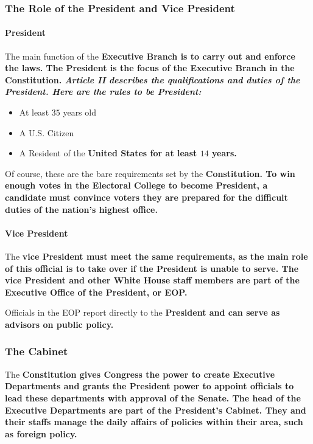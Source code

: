 
\subsubsection*{The Role of the President and Vice President}

\paragraph{President} The main function of the \bf{Executive Branch} is to carry
out and enforce the laws. The \bf{President} is the focus of the \bf{Executive
Branch} in the \bf{Constitution}. \it{Article II} describes the qualifications
and duties of the \bf{President}. Here are the rules to be \bf{President}:

\begin{itemize}
    \item At least $35$ years old
    \item A U.S. Citizen
    \item A Resident of the \bf{United States} for at least $14$ years.
\end{itemize}

Of course, these are the bare requirements set by the \bf{Constitution}. To win
enough votes in the \bf{Electoral College} to become \bf{President}, a candidate
must convince voters they are prepared for the difficult duties of the nation's
highest office.

\paragraph{Vice President} The \bf{vice President} must meet the same
requirements, as the main role of this official is to take over if the
\bf{President} is unable to serve. The \bf{vice President} and other \bf{White
House staff members} are part of the \bf{Executive Office} of the
\bf{President}, or EOP.

Officials in the EOP report directly to the \bf{President} and can serve as
advisors on public policy.

\subsubsection*{The Cabinet}

The \bf{Constitution} gives \bf{Congress} the power to create \bf{Executive
Departments} and grants the \bf{President} power to appoint officials to lead
these departments with approval of the \bf{Senate}. The head of the
\bf{Executive Departments} are part of the \bf{President's Cabinet}. They and
their staffs manage the daily affairs of policies within their area, such as
foreign policy.

